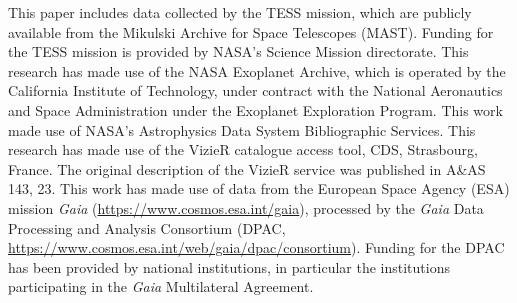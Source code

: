 \documentclass[RNAAS]{aastex62}
\begin{document}
%
This paper includes data collected by the TESS mission, which are
publicly available from the Mikulski Archive for Space Telescopes
(MAST).
%
Funding for the TESS mission is provided by NASA's Science Mission
directorate.
%
This research has made use of the NASA Exoplanet Archive, which is
operated by the California Institute of Technology, under contract
with the National Aeronautics and Space Administration under the
Exoplanet Exploration Program.
%
This work made use of NASA's Astrophysics Data System Bibliographic
Services.
%
This research has made use of the VizieR catalogue access tool, CDS,
Strasbourg, France. The original description of the VizieR service was
published in A\&AS 143, 23.
%
This work has made use of data from the European Space Agency (ESA)
mission {\it Gaia} (\url{https://www.cosmos.esa.int/gaia}), processed
by the {\it Gaia} Data Processing and Analysis Consortium (DPAC,
\url{https://www.cosmos.esa.int/web/gaia/dpac/consortium}). Funding
for the DPAC has been provided by national institutions, in particular
the institutions participating in the {\it Gaia} Multilateral
Agreement.
%
\newline
%

                            
 
\end{document}
